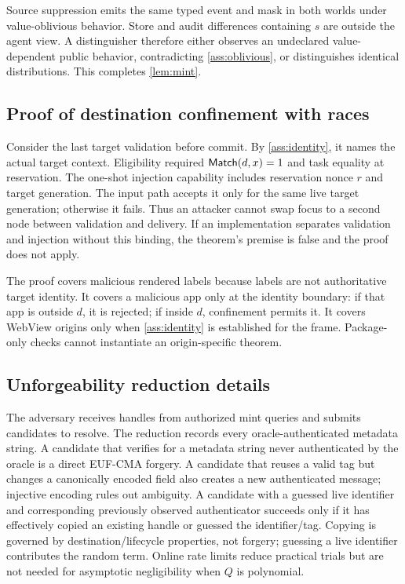 Source suppression emits the same typed event and mask in both worlds under value-oblivious behavior. Store and audit differences containing $s$ are outside the agent view. A distinguisher therefore either observes an undeclared value-dependent public behavior, contradicting \cref{ass:oblivious}, or distinguishes identical distributions. This completes \cref{lem:mint}.

\subsection{Proof of destination confinement with races}

Consider the last target validation before commit. By \cref{ass:identity}, it names the actual target context. Eligibility required $\mathsf{Match}(d,x)=1$ and task equality at reservation. The one-shot injection capability includes reservation nonce $r$ and target generation. The input path accepts it only for the same live target generation; otherwise it fails. Thus an attacker cannot swap focus to a second node between validation and delivery. If an implementation separates validation and injection without this binding, the theorem's premise is false and the proof does not apply.

The proof covers malicious rendered labels because labels are not authoritative target identity. It covers a malicious app only at the identity boundary: if that app is outside $d$, it is rejected; if inside $d$, confinement permits it. It covers WebView origins only when \cref{ass:identity} is established for the frame. Package-only checks cannot instantiate an origin-specific theorem.

\subsection{Unforgeability reduction details}

The adversary receives handles from authorized mint queries and submits candidates to resolve. The reduction records every oracle-authenticated metadata string. A candidate that verifies for a metadata string never authenticated by the oracle is a direct EUF-CMA forgery. A candidate that reuses a valid tag but changes a canonically encoded field also creates a new authenticated message; injective encoding rules out ambiguity. A candidate with a guessed live identifier and corresponding previously observed authenticator succeeds only if it has effectively copied an existing handle or guessed the identifier/tag. Copying is governed by destination/lifecycle properties, not forgery; guessing a live identifier contributes the random term. Online rate limits reduce practical trials but are not needed for asymptotic negligibility when $Q$ is polynomial.

